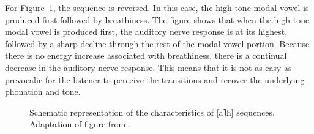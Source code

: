For Figure~\ref{fig:silverman_19}, the sequence is reversed. In this case, the high-tone modal vowel is produced first followed by breathiness. The figure shows that when the high tone modal vowel is produced first, the auditory nerve response is at its highest, followed by a sharp decline through the rest of the modal vowel portion. Because there is no energy increase associated with breathiness, there is a continual decrease in the auditory nerve response. This means that it is not as easy as prevocalic for the listener to perceive the transitions and recover the underlying phonation and tone.
\begin{figure}[h!]
    \centering
    \caption{Schematic representation of the characteristics of [a˥h] sequences. Adaptation of figure from \citet{silvermanLaryngealComplexityOtomanguean1997}.}
    \label{fig:silverman_19}
\end{figure}

